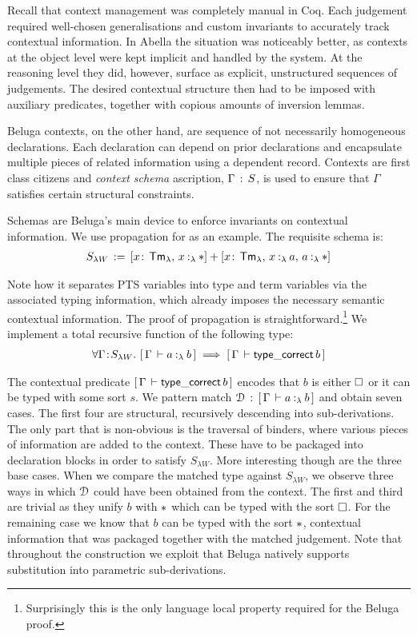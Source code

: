 Recall that context management was completely manual in Coq.
Each judgement required well-chosen generalisations and custom invariants to accurately track contextual information.
In Abella the situation was noticeably better, as contexts at the object level were kept implicit and handled by the system.
At the reasoning level they did, however, surface as explicit, unstructured sequences of judgements.
The desired contextual structure then had to be imposed with auxiliary predicates, together with copious amounts of inversion lemmas.

Beluga contexts, on the other hand, are sequence of not necessarily homogeneous declarations.
Each declaration can depend on prior declarations and encapsulate multiple pieces of related information using a dependent record.
Contexts are first class citizens and \emph{context schema} ascription, $\Gamma \mathrel{\, : \,} S$, is used to ensure that $\Gamma$ satisfies certain structural constraints.

Schemas are Beluga's main device to enforce invariants on contextual information.
We use propagation for \SysL as an example.
The requisite schema is:
\newcommand{\sof}{\ensuremath{\!:\ms}}
\newcommand{\ssep}{\ensuremath{,\ms}}
\begin{align*}
  S_{\lambda W} \eqdef [x\sof\TmL \ssep \typingLh{x}{\Prp}] + [x\sof\TmL \ssep \typingLh{x}{a} \ssep \typingLh{a}{\Prp}]
\end{align*}

Note how it separates PTS variables into type and term variables via the associated typing information, which already imposes the necessary semantic contextual information.
The proof of propagation is straightforward.\footnote{Surprisingly this is the only language local property required for the Beluga proof.}
We implement a total recursive function of the following type:
\begin{align*}
  \forall \Gamma \!:\! S_{\lambda W}.\,\, [\,\Gamma\,\vdash a \mathbin{:_{\lambda}} b\,] \implies [\,\Gamma\,\vdash \mathsf{type\_correct}\,b\,]
\end{align*}

The contextual predicate $[\,\Gamma\,\vdash \mathsf{type\_correct}\,b\,]$ encodes that $b$ is either $\square$ or it can be typed with some sort $s$.
We pattern match $\mathcal{D} \mathrel{\, : \,} [\,\Gamma\,\vdash a \mathbin{:_{\lambda}} b\,]$ and obtain seven cases.
The first four are structural, recursively descending into sub-derivations.
The only part that is non-obvious is the traversal of binders, where various pieces of information are added to the context.
These have to be packaged into declaration blocks in order to satisfy $S_{\lambda W}$.
More interesting though are the three base cases.
When we compare the matched type against $S_{\lambda W}$, we observe three ways in which $\mathcal{D}$ could have been obtained from the context.
The first and third are trivial as they unify $b$ with $\Prp$ which can be typed with the sort $\square$.
For the remaining case we know that $b$ can be typed with the sort $\Prp$,  contextual information that was packaged together with the matched judgement.
Note that throughout the construction we exploit that Beluga natively supports substitution into parametric sub-derivations.

